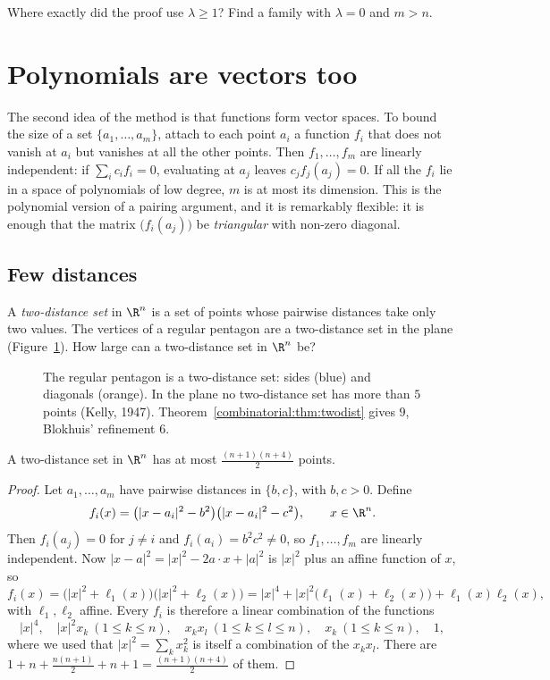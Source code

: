 \begin{think}
Where exactly did the proof use $\lambda\ge1$? Find a family with $\lambda=0$ and $m>n$.
\end{think}

\section{Polynomials are vectors too}

The second idea of the method is that functions form vector spaces. To bound the size of a set $\{a_1,\dots,a_m\}$, attach to each point $a_i$ a function $f_i$ that does not vanish at
$a_i$ but vanishes at all the other points. Then $f_1,\dots,f_m$ are linearly independent: if $\sum_ic_if_i=0$, evaluating at $a_j$ leaves $c_jf_j(a_j)=0$. If all the $f_i$ lie in a
space of polynomials of low degree, $m$ is at most its dimension. This is the polynomial version of a pairing argument, and it is remarkably flexible: it is enough that the matrix
$\bigl(f_i(a_j)\bigr)$ be \emph{triangular} with non-zero diagonal.

\subsection*{Few distances}

A \emph{two-distance set} in $\R^n$ is a set of points whose pairwise distances take only two values. The vertices of a regular pentagon are a two-distance set in the plane (Figure~\ref{combinatorial:fig:pentagon}).
How large can a two-distance set in $\R^n$ be?

\begin{figure}[ht]
\centering
{}
\caption{The regular pentagon is a two-distance set: sides (blue) and diagonals (orange). In the plane no two-distance set has more than $5$ points (Kelly, 1947). Theorem~\ref{combinatorial:thm:twodist} gives $9$, Blokhuis' refinement $6$.}
\label{combinatorial:fig:pentagon}
\end{figure}

\begin{theorem}\label{combinatorial:thm:twodist}
A two-distance set in $\R^n$ has at most $\frac{(n+1)(n+4)}2$ points.
\end{theorem}
\begin{proof}
Let $a_1,\dots,a_m$ have pairwise distances in $\{b,c\}$, with $b,c>0$. Define
\[
f_i(x)=\bigl(|x-a_i|^2-b^2\bigr)\bigl(|x-a_i|^2-c^2\bigr),\qquad x\in\R^n.
\]
Then $f_i(a_j)=0$ for $j\ne i$ and $f_i(a_i)=b^2c^2\ne0$, so $f_1,\dots,f_m$ are linearly independent. Now $|x-a|^2=|x|^2-2a\cdot x+|a|^2$ is $|x|^2$ plus an affine function of $x$, so
\[
f_i(x)=\bigl(|x|^2+\ell_1(x)\bigr)\bigl(|x|^2+\ell_2(x)\bigr)=|x|^4+|x|^2\bigl(\ell_1(x)+\ell_2(x)\bigr)+\ell_1(x)\ell_2(x),
\]
with $\ell_1,\ell_2$ affine. Every $f_i$ is therefore a linear combination of the functions
\[
|x|^4,\quad |x|^2x_k\ (1\le k\le n),\quad x_kx_l\ (1\le k\le l\le n),\quad x_k\ (1\le k\le n),\quad 1,
\]
where we used that $|x|^2=\sum_kx_k^2$ is itself a combination of the $x_kx_l$. There are $1+n+\frac{n(n+1)}2+n+1=\frac{(n+1)(n+4)}2$ of them.
\end{proof}

